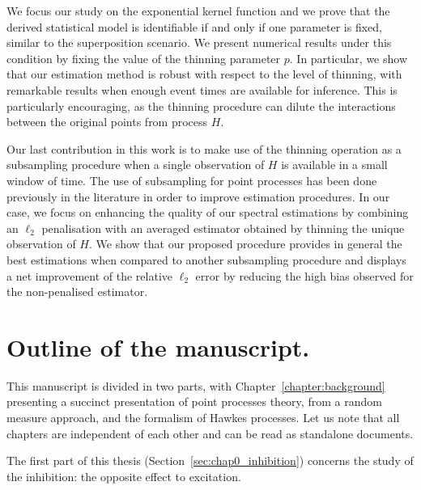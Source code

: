     We focus our study on the exponential kernel function and we prove that the derived statistical model is identifiable if and only if one parameter is fixed, similar to the superposition scenario.
    We present numerical results under this condition by fixing the value of the thinning parameter $p$. 
    In particular, we show that our estimation method is robust with respect to the level of thinning, with remarkable results when enough event times are available for inference.
    This is particularly encouraging, as the thinning procedure can dilute the interactions between the original points from process $H$.
    
    Our last contribution in this work is to make use of the thinning operation as a subsampling procedure when a single observation of $H$ is available in a small window of time.
    The use of subsampling for point processes has been done previously in the literature \parencite{Moller2003, Cronie2024} in order to improve estimation procedures.
    In our case, we focus on enhancing the quality of our spectral estimations by combining an $\ell_2$ penalisation with an averaged estimator obtained by thinning the unique observation of $H$.
    We show that our proposed procedure provides in general the best estimations when compared to another subsampling procedure and displays a net improvement of the relative $\ell_2$ error by reducing the high bias observed for the non-penalised estimator.
    
\section{Outline of the manuscript.}\label{sec:chap0_outline}

    This manuscript is divided in two parts, with Chapter~\ref{chapter:background} presenting a succinct presentation of point processes theory, from a random measure approach, and the formalism of Hawkes processes.
    Let us note that all chapters are independent of each other and can be read as standalone documents.

    The first part of this thesis (Section~\ref{sec:chap0_inhibition}) concerns the study of the inhibition: 
    the opposite effect to excitation.

